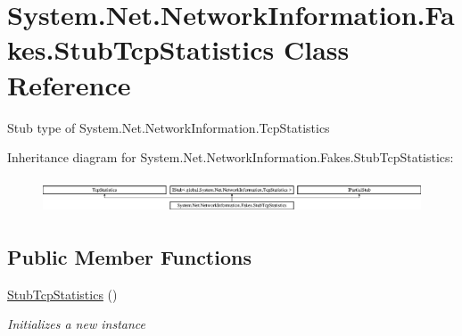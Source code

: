\hypertarget{class_system_1_1_net_1_1_network_information_1_1_fakes_1_1_stub_tcp_statistics}{\section{System.\-Net.\-Network\-Information.\-Fakes.\-Stub\-Tcp\-Statistics Class Reference}
\label{class_system_1_1_net_1_1_network_information_1_1_fakes_1_1_stub_tcp_statistics}
}


Stub type of System.\-Net.\-Network\-Information.\-Tcp\-Statistics 


Inheritance diagram for System.\-Net.\-Network\-Information.\-Fakes.\-Stub\-Tcp\-Statistics\-:\begin{figure}[H]
\begin{center}
\leavevmode
\includegraphics[height=1.039926cm]{class_system_1_1_net_1_1_network_information_1_1_fakes_1_1_stub_tcp_statistics}
\end{center}
\end{figure}
\subsection*{Public Member Functions}
\begin{DoxyCompactItemize}
\item 
\hyperlink{class_system_1_1_net_1_1_network_information_1_1_fakes_1_1_stub_tcp_statistics_a0a2d303474095e032aca804d03422c91}{Stub\-Tcp\-Statistics} ()
\begin{DoxyCompactList}\small\item\em Initializes a new instance\end{DoxyCompactList}\end{DoxyCompactItemize}
